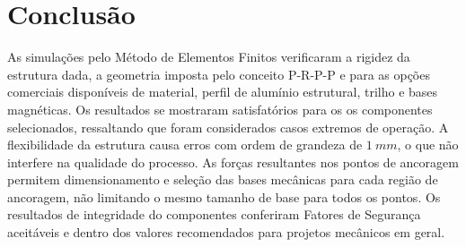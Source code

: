 \section{Conclusão}

As simulações pelo Método de Elementos Finitos verificaram a rigidez da
estrutura dada, a geometria imposta pelo conceito P-R-P-P e para as opções
comerciais disponíveis de material, perfil de alumínio estrutural, trilho e bases
magnéticas.
Os resultados se mostraram satisfatórios para os os componentes selecionados,
ressaltando que foram considerados casos extremos de operação. A flexibilidade
da estrutura causa erros com ordem de grandeza de $1~mm$, o que não interfere na
qualidade do processo.
As forças resultantes nos pontos de ancoragem permitem dimensionamento e seleção
das bases mecânicas para cada região de ancoragem, não limitando o mesmo tamanho
de base para todos os pontos.
Os resultados de integridade do componentes conferiram Fatores de Segurança
aceitáveis e dentro dos valores recomendados para projetos mecânicos em geral.
